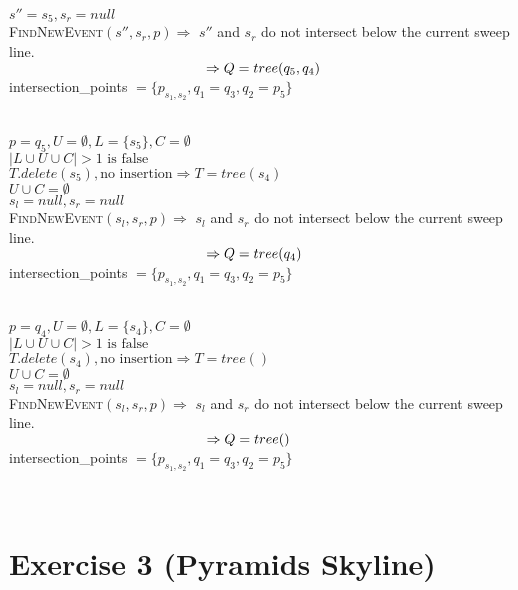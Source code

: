 \documentclass[english, fontsize=12pt, paper=a4, twoside=false, open=right, draft=true, pagesize=auto, version=last, DIV=16]{scrartcl}
\theoremstyle{break}
\begin{document}
$s''=s_5, s_r=null$ \\ 
{\scshape{FindNewEvent}}$(s'',s_r,p) \Rightarrow$ $s''$ and $s_r$ do not intersect below the current sweep line. \\
$\hspace*{49.5mm} \Rightarrow Q=tree(q_5,q_4)$ \\
intersection\_points $= \{p_{s_1,s_2},q_1=q_3,q_2=p_5\}$ \par
\vspace*{-3mm}
\hrulefill \\
\newpage
$p = q_5, U = \emptyset, L=\{s_5\}, C=\emptyset$ \\
$|L \cup U \cup C|>1 \text{ is false}$ \\
$T.delete(s_5), \text{no insertion} \Rightarrow T=tree(s_4)$ \\
$U \cup C=\emptyset$ \\
$s_l=null, s_r=null$ \\ 
{\scshape{FindNewEvent}}$(s_l,s_r,p) \Rightarrow$ $s_l$ and $s_r$ do not intersect below the current sweep line. \\
$\hspace*{49.5mm} \Rightarrow Q=tree(q_4)$ \\
intersection\_points $= \{p_{s_1,s_2},q_1=q_3,q_2=p_5\}$ \par
\vspace*{-3mm}
\hrulefill \\
$p = q_4, U = \emptyset, L=\{s_4\}, C=\emptyset$ \\
$|L \cup U \cup C|>1 \text{ is false}$ \\
$T.delete(s_4), \text{no insertion} \Rightarrow T=tree()$ \\
$U \cup C=\emptyset$ \\
$s_l=null, s_r=null$ \\ 
{\scshape{FindNewEvent}}$(s_l,s_r,p) \Rightarrow$ $s_l$ and $s_r$ do not intersect below the current sweep line. \\
$\hspace*{49.5mm} \Rightarrow Q=tree()$ \\
intersection\_points $= \{p_{s_1,s_2},q_1=q_3,q_2=p_5\}$ \par
\vspace*{-3mm}
\hrulefill \\
\newpage



\section*{Exercise 3 (Pyramids Skyline)}
\newpage
\end{document}
